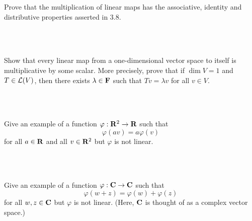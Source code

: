 \begin{exercise}
    Prove that the multiplication of linear maps has the associative, identity and distributive properties asserted in 3.8. \\
\end{exercise}

\begin{solution}
    \\ \td \\
\end{solution}

\begin{exercise}
    Show that every linear map from a one-dimensional vector space to itself is multiplicative by some scalar. More precisely, prove that if $\dim V = 1$ and $T \in \mathcal{L}(V)$, then there exists $\lambda \in \mathbf{F}$ such that $Tv = \lambda v$ for all $v \in V$. \\
\end{exercise}

\begin{solution}
    \\ \td \\
\end{solution}

\begin{exercise}
    Give an example of a function $\varphi : \mathbf{R}^2 \to \mathbf{R}$ such that
    $$\varphi(av) = a\varphi(v)$$
    for all $a \in \mathbf{R}$ and all $v \in \mathbf{R}^2$ but $\varphi$ is not linear.\\
\end{exercise}

\begin{solution}
    \\ \td \\
\end{solution}

\begin{exercise}
    Give an example of a function $\varphi : \mathbf{C} \to \mathbf{C}$ such that
    $$\varphi(w + z) = \varphi(w) + \varphi(z)$$
    for all $w,z \in \mathbf{C}$ but $\varphi$ is not linear. (Here, $\mathbf{C}$ is thought of as a complex vector space.)\\
\end{exercise}

\begin{solution}
    \\ \td \\
\end{solution}